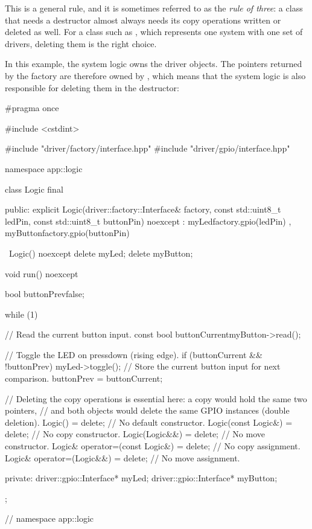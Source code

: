 \note This is a general rule, and it is sometimes referred to as the \emph{rule of three}: a class
that needs a destructor almost always needs its copy operations written or deleted as well. For a
class such as , which represents one system with one set of drivers, deleting them is
the right choice.

In this example, the system logic owns the driver objects. The pointers returned by the factory are
therefore owned by , which means that the system logic is also responsible for deleting
them in the destructor:

\begin{cppcode}
#pragma once

#include <cstdint>

#include "driver/factory/interface.hpp"
#include "driver/gpio/interface.hpp"

namespace app::logic
{
class Logic final
{
public:
    explicit Logic(driver::factory::Interface& factory,
                   const std::uint8_t ledPin, const std::uint8_t buttonPin) noexcept
        : myLed{factory.gpio(ledPin)}
        , myButton{factory.gpio(buttonPin)}
    {}

    ~Logic() noexcept
    {
        delete myLed;
        delete myButton;
    }

    void run() noexcept
    {
        bool buttonPrev{false};

        while (1)
        {
            // Read the current button input.
            const bool buttonCurrent{myButton->read()};

            // Toggle the LED on pressdown (rising edge).
            if (buttonCurrent && !buttonPrev)
            {
                myLed->toggle();
            }
            // Store the current button input for next comparison.
            buttonPrev = buttonCurrent;
        }
    }

    // Deleting the copy operations is essential here: a copy would hold the same two pointers,
    // and both objects would delete the same GPIO instances (double deletion).
    Logic()                        = delete; // No default constructor.
    Logic(const Logic&)            = delete; // No copy constructor.
    Logic(Logic&&)                 = delete; // No move constructor.
    Logic& operator=(const Logic&) = delete; // No copy assignment.
    Logic& operator=(Logic&&)      = delete; // No move assignment.

private:
    driver::gpio::Interface* myLed;
    driver::gpio::Interface* myButton;
};
} // namespace app::logic
\end{cppcode}

